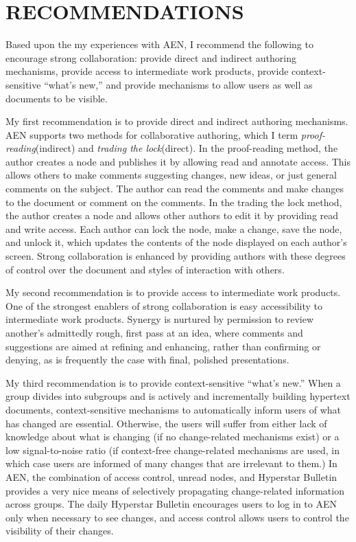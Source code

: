 \section{RECOMMENDATIONS}

Based upon the my experiences with AEN, I recommend the following to
encourage strong collaboration: provide direct and indirect authoring
mechanisms, provide access to intermediate work products, provide
context-sensitive ``what's new,'' and provide mechanisms to allow users as
well as documents to be visible.

My first recommendation is to provide direct and indirect authoring
mechanisms.  AEN supports two methods for collaborative authoring, which I
term {\em proof-reading}(indirect) and {\em trading the lock}(direct).  In
the proof-reading method, the author creates a node and publishes it by
allowing read and annotate access.  This allows others to make comments
suggesting changes, new ideas, or just general comments on the subject.
The author can read the comments and make changes to the document or
comment on the comments.  In the trading the lock method, the author
creates a node and allows other authors to edit it by providing read and
write access.  Each author can lock the node, make a change, save the node,
and unlock it, which updates the contents of the node displayed on each
author's screen.  Strong collaboration is enhanced by providing authors
with these degrees of control over the document and styles of interaction
with others.

My second recommendation is to provide access to intermediate work
products.  One of the strongest enablers of strong collaboration is easy
accessibility to intermediate work products.  Synergy is nurtured by
permission to review another's admittedly rough, first pass at an idea,
where comments and suggestions are aimed at refining and enhancing, rather
than confirming or denying, as is frequently the case with final, polished
presentations.

My third recommendation is to provide context-sensitive ``what's new.''
When a group divides into subgroups and is actively and incrementally
building hypertext documents, context-sensitive mechanisms to automatically
inform users of what has changed are essential. Otherwise, the users will
suffer from either lack of knowledge about what is changing (if no
change-related mechanisms exist) or a low signal-to-noise ratio (if
context-free change-related mechanisms are used, in which case users are
informed of many changes that are irrelevant to them.)  In AEN, the
combination of access control, unread nodes, and Hyperstar Bulletin
provides a very nice means of selectively propagating change-related
information across groups.  The daily Hyperstar Bulletin encourages users
to log in to AEN only when necessary to see changes, and access control
allows users to control the visibility of their changes.

